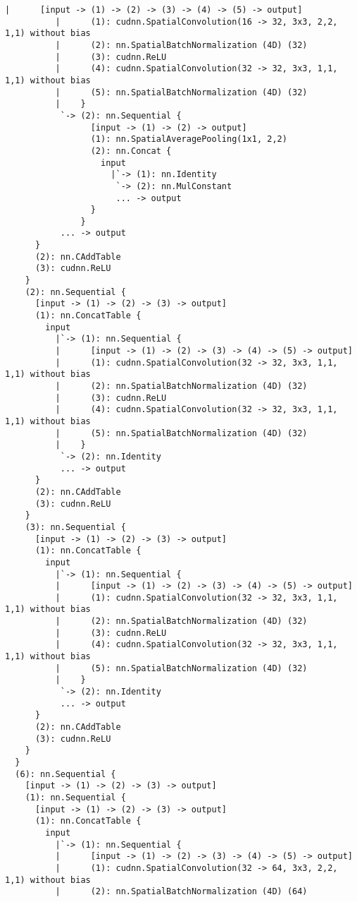 \begin{lstlisting}[language={[5.2]Lua}]
          |      [input -> (1) -> (2) -> (3) -> (4) -> (5) -> output]
          |      (1): cudnn.SpatialConvolution(16 -> 32, 3x3, 2,2, 1,1) without bias
          |      (2): nn.SpatialBatchNormalization (4D) (32)
          |      (3): cudnn.ReLU
          |      (4): cudnn.SpatialConvolution(32 -> 32, 3x3, 1,1, 1,1) without bias
          |      (5): nn.SpatialBatchNormalization (4D) (32)
          |    }
           `-> (2): nn.Sequential {
                 [input -> (1) -> (2) -> output]
                 (1): nn.SpatialAveragePooling(1x1, 2,2)
                 (2): nn.Concat {
                   input
                     |`-> (1): nn.Identity
                      `-> (2): nn.MulConstant
                      ... -> output
                 }
               }
           ... -> output
      }
      (2): nn.CAddTable
      (3): cudnn.ReLU
    }
    (2): nn.Sequential {
      [input -> (1) -> (2) -> (3) -> output]
      (1): nn.ConcatTable {
        input
          |`-> (1): nn.Sequential {
          |      [input -> (1) -> (2) -> (3) -> (4) -> (5) -> output]
          |      (1): cudnn.SpatialConvolution(32 -> 32, 3x3, 1,1, 1,1) without bias
          |      (2): nn.SpatialBatchNormalization (4D) (32)
          |      (3): cudnn.ReLU
          |      (4): cudnn.SpatialConvolution(32 -> 32, 3x3, 1,1, 1,1) without bias
          |      (5): nn.SpatialBatchNormalization (4D) (32)
          |    }
           `-> (2): nn.Identity
           ... -> output
      }
      (2): nn.CAddTable
      (3): cudnn.ReLU
    }
    (3): nn.Sequential {
      [input -> (1) -> (2) -> (3) -> output]
      (1): nn.ConcatTable {
        input
          |`-> (1): nn.Sequential {
          |      [input -> (1) -> (2) -> (3) -> (4) -> (5) -> output]
          |      (1): cudnn.SpatialConvolution(32 -> 32, 3x3, 1,1, 1,1) without bias
          |      (2): nn.SpatialBatchNormalization (4D) (32)
          |      (3): cudnn.ReLU
          |      (4): cudnn.SpatialConvolution(32 -> 32, 3x3, 1,1, 1,1) without bias
          |      (5): nn.SpatialBatchNormalization (4D) (32)
          |    }
           `-> (2): nn.Identity
           ... -> output
      }
      (2): nn.CAddTable
      (3): cudnn.ReLU
    }
  }
  (6): nn.Sequential {
    [input -> (1) -> (2) -> (3) -> output]
    (1): nn.Sequential {
      [input -> (1) -> (2) -> (3) -> output]
      (1): nn.ConcatTable {
        input
          |`-> (1): nn.Sequential {
          |      [input -> (1) -> (2) -> (3) -> (4) -> (5) -> output]
          |      (1): cudnn.SpatialConvolution(32 -> 64, 3x3, 2,2, 1,1) without bias
          |      (2): nn.SpatialBatchNormalization (4D) (64)

\end{lstlisting}
